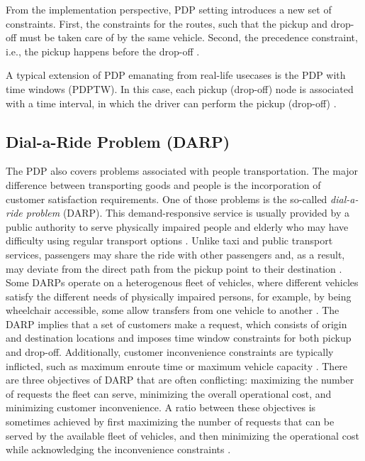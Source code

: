 From the implementation perspective, PDP setting introduces a new set of constraints. First, the constraints for the routes, such that the pickup and drop-off must be taken care of by the same vehicle. Second, the precedence constraint, i.e., the pickup happens before the drop-off \cite{Bono2020}.

A typical extension of PDP emanating from real-life usecases is the PDP with time windows (PDPTW). In this case, each pickup (drop-off) node is associated with a time interval, in which the driver can perform the pickup (drop-off) \cite{wrptw}.

\subsection{Dial-a-Ride Problem (DARP)}

The PDP also covers problems associated with people transportation. The major difference between transporting goods and people is the incorporation of customer satisfaction requirements. One of those problems is the so-called \emph{dial-a-ride problem} (DARP). This demand-responsive service is usually provided by a public authority to serve physically impaired people and elderly who may have difficulty using regular transport options \cite{toth2015vrp}. Unlike taxi and public transport services, passengers may share the ride with other passengers and, as a result, may deviate from the direct path from the pickup point to their destination \cite{darp-survey}. Some DARPs operate on a heterogenous fleet of vehicles, where different vehicles satisfy the different needs of physically impaired persons, for example, by being wheelchair accessible, some allow transfers from one vehicle to another \cite{belhaiza-2019, darp-survey}. The DARP implies that a set of customers make a request, which consists of origin and destination locations and imposes time window constraints for both pickup and drop-off. Additionally, customer inconvenience constraints are typically inflicted, such as maximum enroute time or maximum vehicle capacity \cite{toth2015vrp, belhaiza-2019}. There are three objectives of DARP that are often conflicting: maximizing the number of requests the fleet can serve, minimizing the overall operational cost, and minimizing customer inconvenience. A ratio between these objectives is sometimes achieved by first maximizing the number of requests that can be served by the available fleet of vehicles, and then minimizing the operational cost while acknowledging the inconvenience constraints \cite{cordeau-2007-7}.

